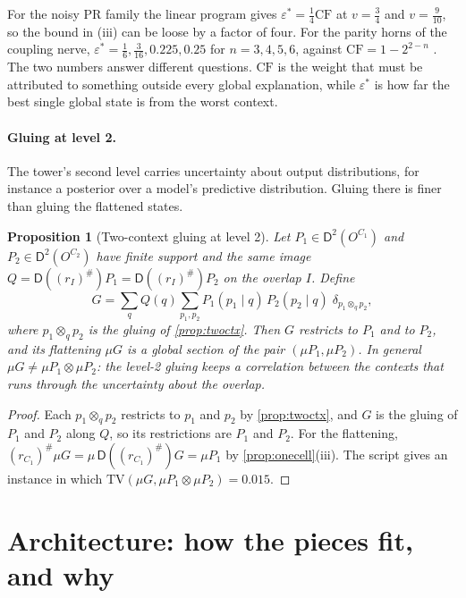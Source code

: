 \documentclass[11pt]{article}
\newtheorem{proposition}[theorem]{Proposition}
\theoremstyle{definition}
\theoremstyle{remark}
\newcommand{\D}{\mathsf{D}}
\newcommand{\TV}{\mathrm{TV}}
\begin{document}
For the noisy PR family the linear program gives $\varepsilon^*=\tfrac14\mathrm{CF}$ at $v=\tfrac34$ and
$v=\tfrac9{10}$, so the bound in (iii) can be loose by a factor of four. For the parity horns of the coupling nerve,
$\varepsilon^*=\tfrac16,\tfrac3{16},0.225,0.25$ for $n=3,4,5,6$, against $\mathrm{CF}=1-2^{2-n}$
\cite[\S13.1]{Awasthi-Family}. The two numbers answer
different questions. $\mathrm{CF}$ is the weight that must be attributed to something outside every
global explanation, while $\varepsilon^*$ is how far the best single global state is from the worst
context.

\paragraph{Gluing at level 2.} The tower's second level carries uncertainty about output
distributions, for instance a posterior over a model's predictive distribution. Gluing there is
finer than gluing the flattened states.

\begin{proposition}[Two-context gluing at level 2]\label{prop:level2}
Let $P_1\in\D^2(O^{C_1})$ and $P_2\in\D^2(O^{C_2})$ have finite support and the same image
$Q=\D((r_I)^\#)P_1=\D((r_I)^\#)P_2$ on the overlap $I$. Define
\[
G=\sum_q Q(q)\sum_{p_1,p_2}P_1(p_1\mid q)\,P_2(p_2\mid q)\;\delta_{p_1\otimes_qp_2},
\]
where $p_1\otimes_qp_2$ is the gluing of \cref{prop:twoctx}. Then $G$ restricts to $P_1$ and to $P_2$,
and its flattening $\mu G$ is a global section of the pair $(\mu P_1,\mu P_2)$. In general
$\mu G\ne\mu P_1\otimes\mu P_2$: the level-2 gluing keeps a correlation between the contexts that runs
through the uncertainty about the overlap.
\end{proposition}
\begin{proof}
Each $p_1\otimes_qp_2$ restricts to $p_1$ and $p_2$ by \cref{prop:twoctx}, and $G$ is the gluing of
$P_1$ and $P_2$ along $Q$, so its restrictions are $P_1$ and $P_2$. For the flattening,
$(r_{C_1})^\#\mu G=\mu\,\D((r_{C_1})^\#)G=\mu P_1$ by \cref{prop:onecell}(iii). The script gives an
instance in which $\TV(\mu G,\mu P_1\otimes\mu P_2)=0.015$.
\end{proof}

\section{Architecture: how the pieces fit, and why}\label{sec:architecture}
\end{document}
